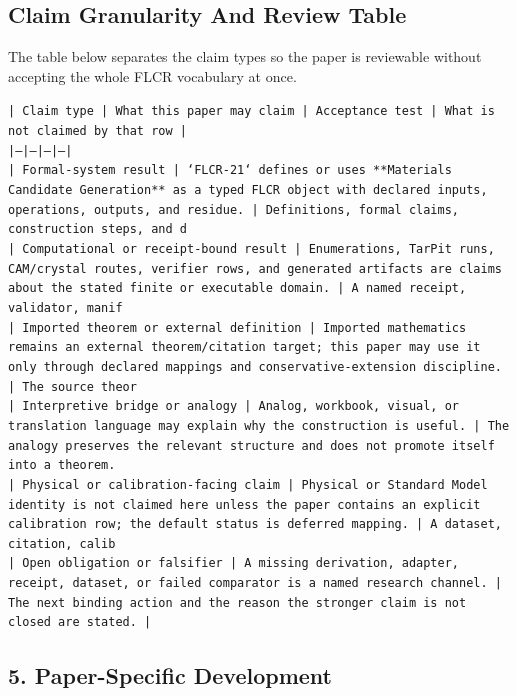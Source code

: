 \documentclass[11pt]{article}
\begin{document}
\subsection*{Claim Granularity And Review Table}

The table below separates the claim types so the paper is reviewable without accepting the whole FLCR vocabulary at once.

\noindent\texttt{| Claim type | What this paper may claim | Acceptance test | What is not claimed by that row |}\\
\noindent\texttt{|---|---|---|---|}\\
\noindent\texttt{| Formal-system result | `FLCR-21` defines or uses **Materials Candidate Generation** as a typed FLCR object with declared inputs, operations, outputs, and residue. | Definitions, formal claims, construction steps, and d}\\
\noindent\texttt{| Computational or receipt-bound result | Enumerations, TarPit runs, CAM/crystal routes, verifier rows, and generated artifacts are claims about the stated finite or executable domain. | A named receipt, validator, manif}\\
\noindent\texttt{| Imported theorem or external definition | Imported mathematics remains an external theorem/citation target; this paper may use it only through declared mappings and conservative-extension discipline. | The source theor}\\
\noindent\texttt{| Interpretive bridge or analogy | Analog, workbook, visual, or translation language may explain why the construction is useful. | The analogy preserves the relevant structure and does not promote itself into a theorem. }\\
\noindent\texttt{| Physical or calibration-facing claim | Physical or Standard Model identity is not claimed here unless the paper contains an explicit calibration row; the default status is deferred mapping. | A dataset, citation, calib}\\
\noindent\texttt{| Open obligation or falsifier | A missing derivation, adapter, receipt, dataset, or failed comparator is a named research channel. | The next binding action and the reason the stronger claim is not closed are stated. | }\\

\subsection*{5. Paper-Specific Development}
\end{document}
